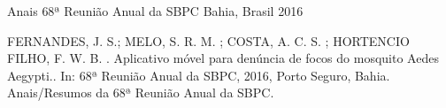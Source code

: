 \begin{cventries}
  \cventry
    {Anais} %
    {68ª Reunião Anual da SBPC} %
    {Bahia, Brasil} %
    {2016} %
    {
      \begin{cvitems} %
        \item {FERNANDES, J. S.; MELO, S. R. M. ; COSTA, A. C. S. ; HORTENCIO FILHO, F. W. B. . Aplicativo móvel para denúncia de focos do mosquito Aedes Aegypti.. In: 68ª Reunião Anual da SBPC, 2016, Porto Seguro, Bahia. Anais/Resumos da 68ª Reunião Anual da SBPC.}
      \end{cvitems}
    }



\end{cventries}
